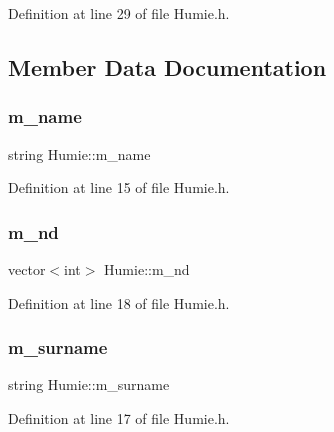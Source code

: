 Definition at line 29 of file Humie.\+h.



\subsection{Member Data Documentation}
\mbox{\label{class_humie_ad1721cb953022792ff05eadc1b18bd13}} 
\subsubsection{\texorpdfstring{m\_name}{m\_name}}
{\footnotesize\ttfamily string Humie\+::m\+\_\+name\hspace{0.3cm}{\ttfamily [protected]}}



Definition at line 15 of file Humie.\+h.

\mbox{\label{class_humie_ad1f9a0feba7e326695739192f6f317fb}} 
\subsubsection{\texorpdfstring{m\_nd}{m\_nd}}
{\footnotesize\ttfamily vector$<$int$>$ Humie\+::m\+\_\+nd\hspace{0.3cm}{\ttfamily [protected]}}



Definition at line 18 of file Humie.\+h.

\mbox{\label{class_humie_a2ff317d172dd031ad358edaf6971afb2}} 
\subsubsection{\texorpdfstring{m\_surname}{m\_surname}}
{\footnotesize\ttfamily string Humie\+::m\+\_\+surname\hspace{0.3cm}{\ttfamily [protected]}}



Definition at line 17 of file Humie.\+h.

\mbox{\label{class_humie_ab8dcd72d3da064284d0628271783771b}} 
